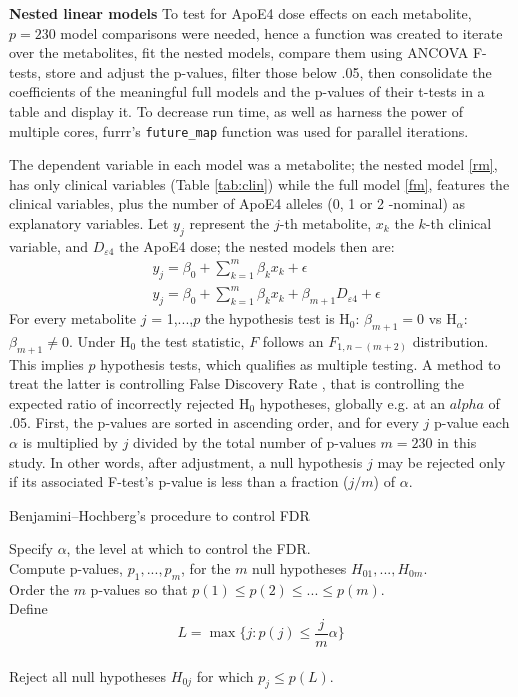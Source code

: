 \documentclass{amsart}
\begin{document}
\leavevmode\newline \textbf{Nested linear models}\hspace{.25cm}
To test for ApoE4 dose effects on each metabolite, $p=230$ model comparisons were needed, hence a function was created to iterate over the metabolites, fit the nested models, compare them using ANCOVA F-tests, store and adjust the p-values, filter those below .05, then consolidate the coefficients of the meaningful full models and the p-values of their t-tests in a table and display it. To decrease run time, as well as harness the power of multiple cores, \textsf{furrr}'s \texttt{future\_map} function was used for parallel iterations.

The dependent variable in each model was a metabolite; the nested model \eqref{rm}, has only clinical variables (Table \ref{tab:clin}) while the full model \eqref{fm}, features the clinical variables, plus the number of ApoE4 alleles (0, 1 or 2 -nominal) as explanatory variables. Let $y_j$ represent the $j$-th metabolite, $x_k$ the $k$-th clinical variable, and $D_{\varepsilon4}$ the ApoE4 dose; the nested models then are:
\begin{align}
    & y_j = \beta_0 + \sum_{k=1}^m\beta_kx_k +\epsilon \label{rm} \\
    & y_j = \beta_0 + \sum_{k=1}^m\beta_kx_k + \beta_{m+1}D_{\varepsilon4} + \epsilon \label{fm}
\end{align}
For every metabolite $j$ = 1,...,$p$ the hypothesis test is 
H$_0$: $\beta_{m+1} = 0 $ vs H$_\alpha$: $\beta_{m+1} \neq 0$.
Under H$_0$ the test statistic, $F$ follows an $F_{1, n-(m+2)}$ distribution. This implies $p$ hypothesis tests, which qualifies as multiple testing. A method to treat the latter is controlling False Discovery Rate \cite{Benjamini1995ControllingTesting}, that is controlling the expected ratio of incorrectly rejected H$_0$ hypotheses, globally e.g. at an $alpha$ of .05. First, the p-values are sorted in ascending order, and for every $j$ p-value each $\alpha$ is multiplied by $j$ divided by the total number of p-values \cite{Benjamini1995ControllingTesting} $m = 230$ in this study. In other words, after adjustment, a null hypothesis $j$ may be rejected only if its associated F-test's p-value is less than a fraction ($j/m$) of $\alpha$.

\begin{algorithm}
\caption{Benjamini–Hochberg's procedure to control FDR}\label{alg:fdr}
Specify $\alpha$, the level at which to control the FDR.\\
Compute p-values, $p_1, ... , p_m$, for the $m$ null hypotheses $H_{01},...,H_{0m}$. \\
Order the $m$ p-values so that $p(1) \leq p(2) \leq ... \leq p(m)$.\\
Define
\[L = \max\{j : p(j) \leq \frac{j}{m}\alpha\}\] \\
Reject all null hypotheses $H_{0j}$ for which $p_j \leq p(L)$.
\end{algorithm}
\end{document}
